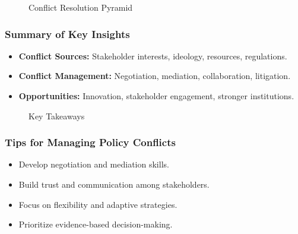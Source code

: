 \documentclass[10pt]{beamer}
\begin{document}
\begin{frame}
\begin{frame}
            \begin{figure}
                \centering
                \caption{Conflict Resolution Pyramid}
            \end{figure}
            \end{frame}
            
            \begin{frame}
            \frametitle{Summary of Key Insights}
            \begin{itemize}
                \item \textbf{Conflict Sources:} Stakeholder interests, ideology, resources, regulations.
                \item \textbf{Conflict Management:} Negotiation, mediation, collaboration, litigation.
                \item \textbf{Opportunities:} Innovation, stakeholder engagement, stronger institutions.
            \end{itemize}
            
            \begin{figure}
                \centering
                \caption{Key Takeaways}
            \end{figure}
            \end{frame}
            
            \begin{frame}
            \frametitle{Tips for Managing Policy Conflicts}
            \begin{itemize}
                \item Develop negotiation and mediation skills.
                \item Build trust and communication among stakeholders.
                \item Focus on flexibility and adaptive strategies.
                \item Prioritize evidence-based decision-making.
            \end{itemize}
            

\end{frame}
\end{frame}
\end{document}
